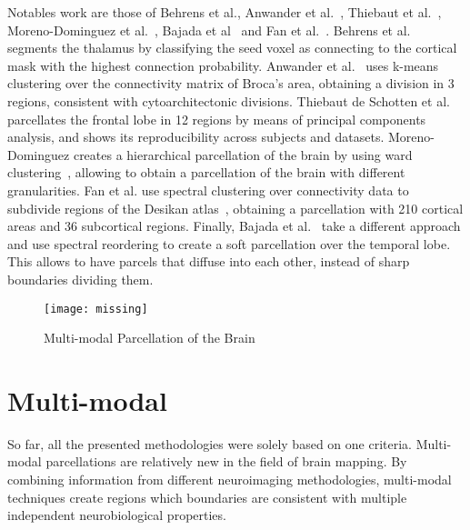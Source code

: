 Notables work are those of Behrens et al.\cite{Behrens2003}, Anwander et al.~\cite{Anwander2006},
Thiebaut et al.~\cite{ThiebautdeSchotten2016}, Moreno-Dominguez et al.~\cite{Moreno-Dominguez2014},
Bajada et al~\cite{Bajada2017} and Fan et al.~\cite{Fan2016}.
Behrens et al.~\cite{Behrens2003} segments the thalamus by classifying the seed voxel as connecting to the cortical
mask with the highest connection probability. Anwander et al.~\cite{Anwander2006}
uses k-means clustering over the connectivity matrix of Broca's area, obtaining
a division in 3 regions, consistent with cytoarchitectonic divisions.
Thiebaut de Schotten et al.~\cite{ThiebautdeSchotten2016}
parcellates the frontal lobe in 12 regions by means of principal components analysis,
and shows its reproducibility across subjects and datasets.
Moreno-Dominguez creates a hierarchical parcellation of the brain by using
ward clustering~\cite{Moreno-Dominguez2014}, allowing to obtain a parcellation
of the brain with different granularities. Fan et al.\cite{Fan2016} use
spectral clustering over connectivity data to subdivide regions of the Desikan
atlas~\cite{Desikan2006}, obtaining a parcellation with 210 cortical areas and
36 subcortical regions. Finally, Bajada et al.~\cite{Bajada2017} take a different
approach and use spectral reordering to create a soft parcellation over the
temporal lobe. This allows to have parcels that diffuse into each other, instead
of sharp boundaries dividing them.

\begin{figure*}[t]
    \texttt{[image: missing]}
    \caption{Multi-modal Parcellation of the Brain}
    \label{fig:brain_function}
\end{figure*}

\section{Multi-modal}
\label{sec:multimodal}
So far, all the presented methodologies were solely based on one criteria.
Multi-modal parcellations are relatively new in the field of brain mapping.
By combining information from different neuroimaging methodologies, multi-modal
techniques create regions which boundaries are consistent with multiple
independent neurobiological properties.

